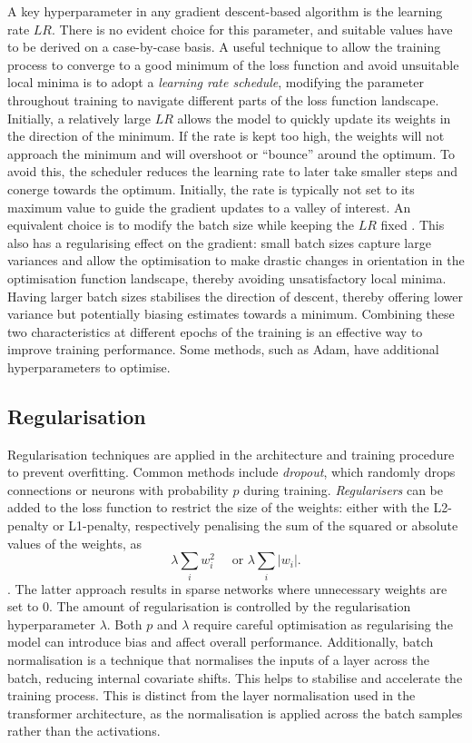 A key hyperparameter in any gradient descent-based algorithm is the learning rate $LR$. There is no evident choice for this parameter, and suitable values have to be derived on a case-by-case basis. A useful technique to allow the training process to converge to a good minimum of the loss function and avoid unsuitable local minima is to adopt a \textit{learning rate schedule}, modifying the parameter throughout training to navigate different parts of the loss function landscape. Initially, a relatively large $LR$ allows the model to quickly update its weights in the direction of the minimum. If the rate is kept too high, the weights will not approach the minimum and will overshoot or ``bounce'' around the optimum. To avoid this, the scheduler reduces the learning rate to later take smaller steps and conerge towards the optimum. Initially, the rate is typically not set to its maximum value to guide the gradient updates to a valley of interest. An equivalent choice is to modify the batch size while keeping the $LR$ fixed \cite{smith2017decay}. This also has a regularising effect on the gradient: small batch sizes capture large variances and allow the optimisation to make drastic changes in orientation in the optimisation function landscape, thereby avoiding unsatisfactory local minima. Having larger batch sizes stabilises the direction of descent, thereby offering lower variance but potentially biasing estimates towards a minimum. Combining these two characteristics at different epochs of the training is an effective way to improve training performance. Some methods, such as Adam, have additional hyperparameters to optimise.

\subsection{Regularisation}
Regularisation techniques are applied in the architecture and training procedure to prevent overfitting. Common methods include \textit{dropout}, which randomly drops connections or neurons with probability $p$ during training. \textit{Regularisers} can be added to the loss function to restrict the size of the weights: either with the L2-penalty or L1-penalty, respectively penalising the sum of the squared or absolute values of the weights, as \[\lambda \sum_i w_i^2 \quad \text{ or } \lambda \sum_i |w_i|.\]. The latter approach results in sparse networks where unnecessary weights are set to 0. The amount of regularisation is controlled by the regularisation hyperparameter $\lambda$. Both $p$ and $\lambda$ require careful optimisation as regularising the model can introduce bias and affect overall performance. Additionally, batch normalisation is a technique that normalises the inputs of a layer across the batch, reducing internal covariate shifts. This helps to stabilise and accelerate the training process. This is distinct from the layer normalisation used in the transformer architecture, as the normalisation is applied across the batch samples rather than the activations. 

